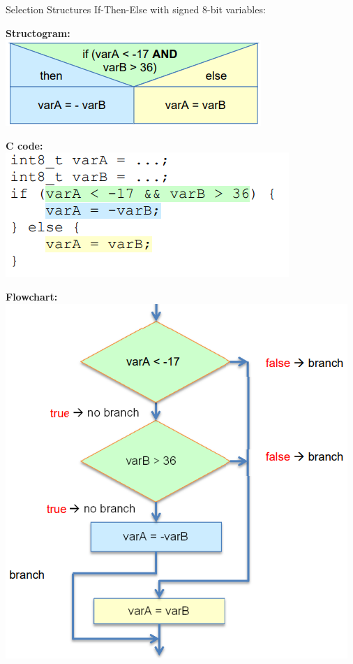 \begin{example2}{Selection Structures}
If-Then-Else with signed 8-bit variables:
\vspace{2mm}\\
\begin{minipage}[t]{0.5\linewidth}
\textbf{Structogram:}\\
\includegraphics[width=\linewidth]{images/structogramex2.png}
\end{minipage}
\begin{minipage}[t]{0.48\linewidth}
\textbf{C code:}
\vspace{2mm}\\
\includegraphics[width=\linewidth]{images/ccodeex2.png}
\end{minipage}

\textbf{Flowchart:}\\
\includegraphics[width=0.7\linewidth]{images/flowchartex2.png}


\end{example2}
